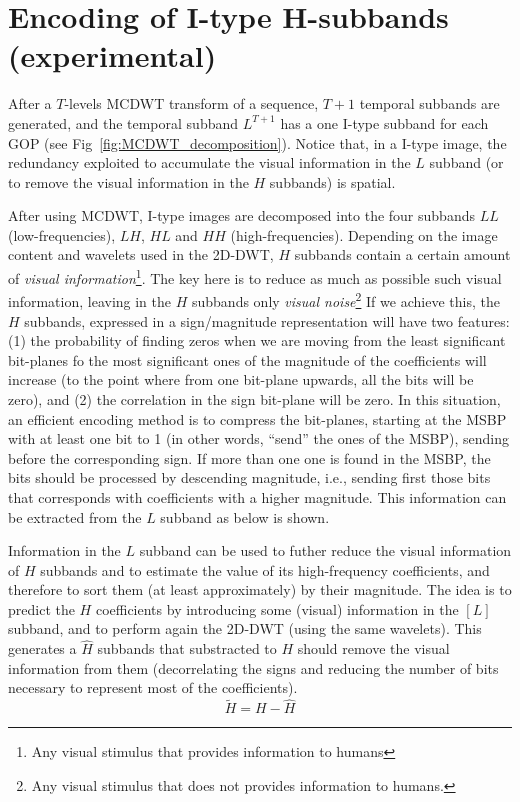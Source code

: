 
\section{Encoding of I-type H-subbands (experimental)}

After a $T$-levels MCDWT transform of a sequence, $T+1$ temporal
subbands are generated, and the temporal subband $L^{T+1}$ has a one
I-type subband for each GOP (see
Fig~\ref{fig:MCDWT_decomposition}). Notice that, in a I-type image,
the redundancy exploited to accumulate the visual information in the
$L$ subband (or to remove the visual information in the $H$ subbands)
is spatial.

After using MCDWT, I-type images are decomposed into
the four subbands $LL$ (low-frequencies), $LH$, $HL$ and $HH$
(high-frequencies). Depending on the image content and wavelets used
in the 2D-DWT, $H$ subbands contain a certain amount of \emph{visual
  information}\footnote{Any visual stimulus that provides information
  to humans}. The key here is to reduce as much as possible such
visual information, leaving in the $H$ subbands only \emph{visual
  noise}\footnote{Any visual stimulus that does not provides
  information to humans.} If we achieve this, the $H$ subbands,
expressed in a sign/magnitude representation will have two features:
(1) the probability of finding zeros when we are moving from the least
significant bit-planes fo the most significant ones of the magnitude
of the coefficients will increase (to the point where from one
bit-plane upwards, all the bits will be zero), and (2) the correlation
in the sign bit-plane will be zero. In this situation, an efficient
encoding method is to compress the bit-planes, starting at the MSBP
with at least one bit to 1 (in other words, ``send'' the ones of the
MSBP), sending before the corresponding sign. If more than one one is
found in the MSBP, the bits should be processed by descending
magnitude, i.e., sending first those bits that corresponds with
coefficients with a higher magnitude. This information can be
extracted from the $L$ subband as below is shown.

Information in the $L$ subband can be used to futher reduce the visual
information of $H$ subbands and to estimate the value of its
high-frequency coefficients, and therefore to sort them (at least
approximately) by their magnitude. The idea is to predict the $H$
coefficients by introducing some (visual) information in the $[L]$
subband, and to perform again the 2D-DWT (using the same
wavelets). This generates a $\hat{H}$ subbands that substracted to $H$
should remove the visual information from them (decorrelating the
signs and reducing the number of bits necessary to represent most of
the coefficients).
\begin{equation}
  \tilde{H} = H - \hat{H}
\end{equation}

